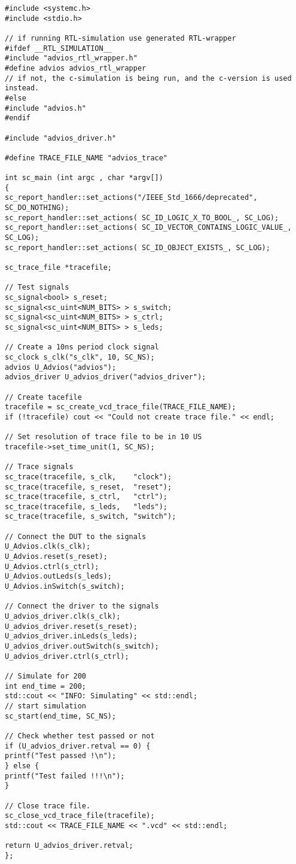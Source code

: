 \begin{lstlisting}
#include <systemc.h>
#include <stdio.h>

// if running RTL-simulation use generated RTL-wrapper
#ifdef __RTL_SIMULATION__
#include "advios_rtl_wrapper.h"
#define advios advios_rtl_wrapper
// if not, the c-simulation is being run, and the c-version is used instead.
#else
#include "advios.h"
#endif

#include "advios_driver.h"

#define TRACE_FILE_NAME "advios_trace"

int sc_main (int argc , char *argv[])
{
sc_report_handler::set_actions("/IEEE_Std_1666/deprecated", SC_DO_NOTHING);
sc_report_handler::set_actions( SC_ID_LOGIC_X_TO_BOOL_, SC_LOG);
sc_report_handler::set_actions( SC_ID_VECTOR_CONTAINS_LOGIC_VALUE_, SC_LOG);
sc_report_handler::set_actions( SC_ID_OBJECT_EXISTS_, SC_LOG);

sc_trace_file *tracefile;

// Test signals
sc_signal<bool> s_reset;
sc_signal<sc_uint<NUM_BITS> > s_switch;
sc_signal<sc_uint<NUM_BITS> > s_ctrl;
sc_signal<sc_uint<NUM_BITS> > s_leds;

// Create a 10ns period clock signal
sc_clock s_clk("s_clk", 10, SC_NS);
advios U_Advios("advios");
advios_driver U_advios_driver("advios_driver");

// Create tacefile
tracefile = sc_create_vcd_trace_file(TRACE_FILE_NAME);
if (!tracefile) cout << "Could not create trace file." << endl;

// Set resolution of trace file to be in 10 US
tracefile->set_time_unit(1, SC_NS);

// Trace signals
sc_trace(tracefile, s_clk,    "clock");
sc_trace(tracefile, s_reset,  "reset");
sc_trace(tracefile, s_ctrl,   "ctrl");
sc_trace(tracefile, s_leds,   "leds");
sc_trace(tracefile, s_switch, "switch");

// Connect the DUT to the signals
U_Advios.clk(s_clk);
U_Advios.reset(s_reset);
U_Advios.ctrl(s_ctrl);
U_Advios.outLeds(s_leds);
U_Advios.inSwitch(s_switch);

// Connect the driver to the signals
U_advios_driver.clk(s_clk);
U_advios_driver.reset(s_reset);
U_advios_driver.inLeds(s_leds);
U_advios_driver.outSwitch(s_switch);
U_advios_driver.ctrl(s_ctrl);

// Simulate for 200
int end_time = 200;
std::cout << "INFO: Simulating" << std::endl;
// start simulation
sc_start(end_time, SC_NS);

// Check whether test passed or not
if (U_advios_driver.retval == 0) {
printf("Test passed !\n");
} else {
printf("Test failed !!!\n");
}

// Close trace file.
sc_close_vcd_trace_file(tracefile);
std::cout << TRACE_FILE_NAME << ".vcd" << std::endl;

return U_advios_driver.retval;
};

 \end{lstlisting}
\label{lst:tb_advios}


